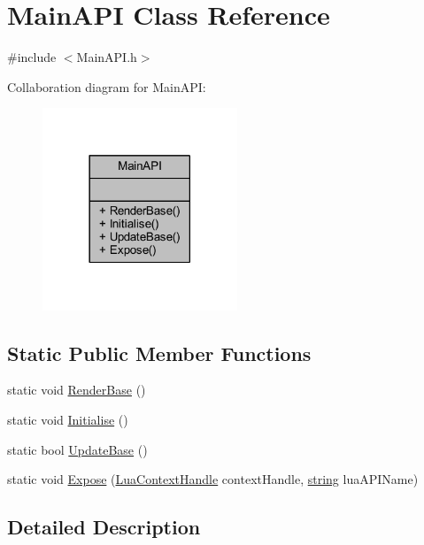 \hypertarget{class_main_a_p_i}{}\section{Main\+A\+PI Class Reference}
\label{class_main_a_p_i}


{\ttfamily \#include $<$Main\+A\+P\+I.\+h$>$}



Collaboration diagram for Main\+A\+PI\+:\nopagebreak
\begin{figure}[H]
\begin{center}
\leavevmode
\includegraphics[width=165pt]{class_main_a_p_i__coll__graph}
\end{center}
\end{figure}
\subsection*{Static Public Member Functions}
\begin{DoxyCompactItemize}
\item 
static void \hyperlink{class_main_a_p_i_acdf21df8cefaf44080b8faf6374f6064}{Render\+Base} ()
\item 
static void \hyperlink{class_main_a_p_i_a2aec6cf98212b331f64ac4d0f4ba2ec1}{Initialise} ()
\item 
static bool \hyperlink{class_main_a_p_i_a7a84ec743c25ebde51674bff25868274}{Update\+Base} ()
\item 
static void \hyperlink{class_main_a_p_i_af280bf0e93007830a6dc9b09f4eb0e10}{Expose} (\hyperlink{_lua_context_8h_a2ffcc2d3ed21165072a1d7b61259bf14}{Lua\+Context\+Handle} context\+Handle, \hyperlink{_types_8h_ad453f9f71ce1f9153fb748d6bb25e454}{string} lua\+A\+P\+I\+Name)
\end{DoxyCompactItemize}


\subsection{Detailed Description}


